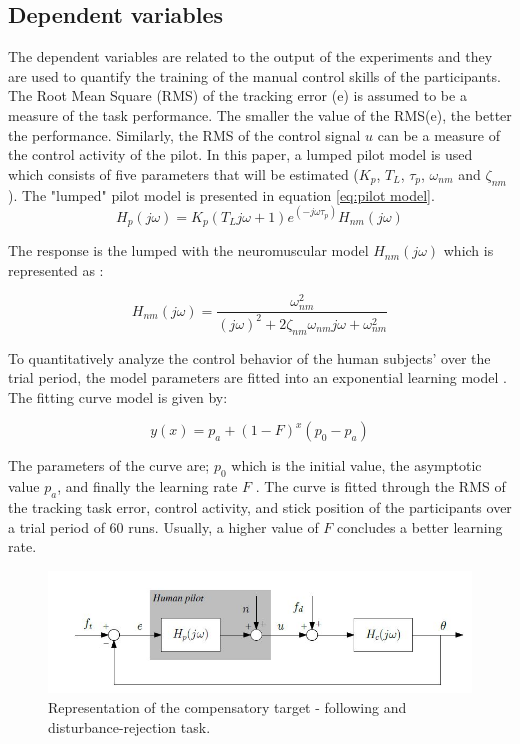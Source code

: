 \documentclass[conference]{IEEEtran}
\begin{document}
\subsection{Dependent variables}\label{Dependent variables}
The dependent variables are related to the output of the experiments and they are used to quantify the training of the manual control skills of the participants.  The Root Mean Square (RMS) of the tracking error (e) is assumed to be a measure of the task performance. The smaller the value of the RMS(e), the better the performance. Similarly, the RMS of the control signal $u$ can be a measure of the control activity of the pilot. In this paper, a lumped pilot model is used which consists of five parameters that will be estimated ($K_p$, $T_L$, $\tau_p$, $\omega_{nm}$ and $\zeta_{nm}$). The "lumped" pilot model is presented in equation \ref{eq:pilot model}.\\
\begin{equation}\label{eq:pilot model}
    H_p(j\omega) = K_p(T_L j\omega + 1)e^{(-j\omega\tau_p)}H_{nm}(j\omega)
\end{equation}

The response is the lumped with the neuromuscular model $H_{nm}(j \omega)$ which is represented as :

\begin{equation}\label{eq:neuromuscular}
    H_{nm}(j\omega) = \frac{\omega^2_{nm}}{(j\omega)^2 +2\zeta_{nm}\omega_{nm}j\omega +\omega^2_{nm}}
\end{equation}

To quantitatively analyze the control behavior of the human subjects' over the trial period, the model parameters are fitted into an exponential learning model \cite{pool2016effects}. The fitting curve model is given by: 

\begin{equation}\label{eq:learning}
    y (x) = p_a +(1-F)^x(p_0-p_a)
\end{equation}

The parameters of the curve are; $p_0$ which is the initial value, the asymptotic value $p_a$, and finally the learning rate $F$ \cite{cp:Levison1979}. The curve is fitted through the RMS of the tracking task error, control activity, and stick position of the participants over a trial period of 60 runs. Usually, a higher value of $F$ concludes a better learning rate.\\

\begin{figure}[hbt]
\centering
\includegraphics[width = 0.8\linewidth]{images/control_tast.JPG}
\caption{Representation of the compensatory target - following and disturbance-rejection task.}
\label{fig:control task}
\end{figure}
\end{document}
